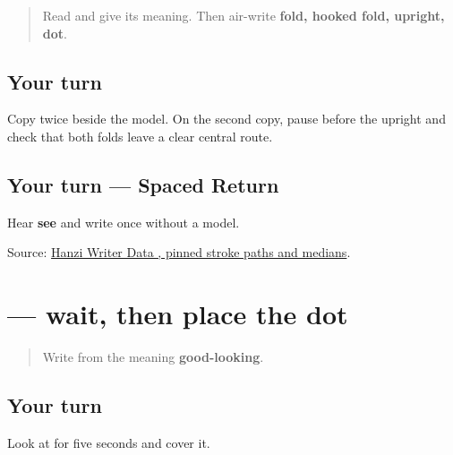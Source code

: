 \label{lesson:ZH-W18-shu-guided}



\begin{quote}
Read \textbf{} and give its meaning. Then air-write \textbf{fold, hooked fold, upright, dot}.
\end{quote}

\subsection*{Your turn}

Copy \textbf{} twice beside the model. On the second copy, pause before the upright and check that both folds leave a clear central route.

\subsection*{Your turn — Spaced Return}
Hear \textbf{see} and write  once without a model.

\begin{tcolorbox}[breakable,colback=teal!4,colframe=teal!35!black,title={Before you move on}]
Source: \href{https://raw.githubusercontent.com/chanind/hanzi-writer-data/68d10a4b21150cae5e1ebbd223eed289cf32d90c/data/\%E4\%B9\%A6.json}{Hanzi Writer Data , pinned stroke paths and medians}.
\end{tcolorbox}
\section[\texorpdfstring{\zh{书} (shū)}{书 (shū)}]{ — wait, then place the dot}

\label{lesson:ZH-W18-shu-delayed}



\begin{quote}
Write \textbf{} from the meaning \textbf{good-looking}.
\end{quote}

\subsection*{Your turn}

Look at \textbf{} for five seconds and cover it.

